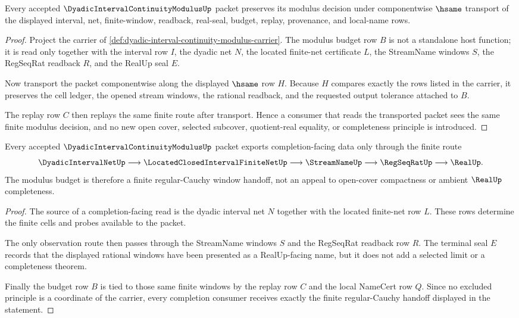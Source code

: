 \begin{theorem}
\label{thm:dyadic-interval-continuity-modulus-window-stability}
Every accepted $\DyadicIntervalContinuityModulusUp$ packet preserves its modulus decision under componentwise $\hsame$ transport of the displayed interval, net, finite-window, readback, real-seal, budget, replay, provenance, and local-name rows.
\end{theorem}
\begin{proof}
Project the carrier of \autoref{def:dyadic-interval-continuity-modulus-carrier}. The modulus budget row $B$ is not a standalone host function; it is read only together with the interval row $I$, the dyadic net $N$, the located finite-net certificate $L$, the StreamName windows $S$, the RegSeqRat readback $R$, and the RealUp seal $E$.

Now transport the packet componentwise along the displayed $\hsame$ row $H$. Because $H$ compares exactly the rows listed in the carrier, it preserves the cell ledger, the opened stream windows, the rational readback, and the requested output tolerance attached to $B$.

The replay row $C$ then replays the same finite route after transport. Hence a consumer that reads the transported packet sees the same finite modulus decision, and no new open cover, selected subcover, quotient-real equality, or completeness principle is introduced.
\end{proof}

\begin{theorem}
\label{thm:dyadic-interval-continuity-modulus-regular-cauchy-handoff}
Every accepted $\DyadicIntervalContinuityModulusUp$ packet exports completion-facing data only through the finite route
$$
\DyadicIntervalNetUp \longrightarrow \LocatedClosedIntervalFiniteNetUp \longrightarrow \StreamNameUp \longrightarrow \RegSeqRatUp \longrightarrow \RealUp .
$$
The modulus budget is therefore a finite regular-Cauchy window handoff, not an appeal to open-cover compactness or ambient $\RealUp$ completeness.
\end{theorem}
\begin{proof}
The source of a completion-facing read is the dyadic interval net $N$ together with the located finite-net row $L$. These rows determine the finite cells and probes available to the packet.

The only observation route then passes through the StreamName windows $S$ and the RegSeqRat readback row $R$. The terminal seal $E$ records that the displayed rational windows have been presented as a RealUp-facing name, but it does not add a selected limit or a completeness theorem.

Finally the budget row $B$ is tied to those same finite windows by the replay row $C$ and the local NameCert row $Q$. Since no excluded principle is a coordinate of the carrier, every completion consumer receives exactly the finite regular-Cauchy handoff displayed in the statement.
\end{proof}

